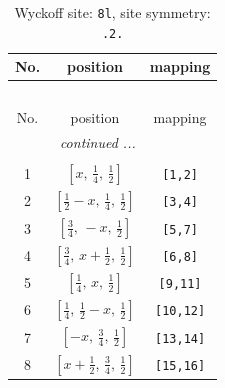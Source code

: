 \documentclass[fleqn,8pt]{jsarticle}
\begin{document}
\begin{longtable}{ccc}
\caption{Wyckoff site: {\tt 8l}, site symmetry: {\tt .2.}}
 \\
 \hline \hline
No. & position & mapping \\ \hline \endfirsthead

\multicolumn{2}{l}{\tablename\ \thetable{}} \\
 \hline \hline
No. & position & mapping \\ \hline \endhead

 \hline \hline
\multicolumn{2}{r}{\footnotesize\it continued ...} \\ \endfoot

 \hline \hline
\multicolumn{2}{r}{} \\ \endlastfoot

1 & $\left[ x,\, \frac{1}{4},\, \frac{1}{2} \right]$ & {\tt [1,2]} \\ \hline
2 & $\left[ \frac{1}{2} - x,\, \frac{1}{4},\, \frac{1}{2} \right]$ & {\tt [3,4]} \\ \hline
3 & $\left[ \frac{3}{4},\, - x,\, \frac{1}{2} \right]$ & {\tt [5,7]} \\ \hline
4 & $\left[ \frac{3}{4},\, x + \frac{1}{2},\, \frac{1}{2} \right]$ & {\tt [6,8]} \\ \hline
5 & $\left[ \frac{1}{4},\, x,\, \frac{1}{2} \right]$ & {\tt [9,11]} \\ \hline
6 & $\left[ \frac{1}{4},\, \frac{1}{2} - x,\, \frac{1}{2} \right]$ & {\tt [10,12]} \\ \hline
7 & $\left[ - x,\, \frac{3}{4},\, \frac{1}{2} \right]$ & {\tt [13,14]} \\ \hline
8 & $\left[ x + \frac{1}{2},\, \frac{3}{4},\, \frac{1}{2} \right]$ & {\tt [15,16]} \\
\end{longtable}
\renewcommand{\arraystretch}{1.2}
\end{document}
